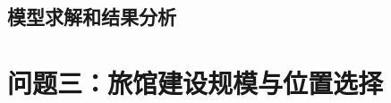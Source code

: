 



\subsection[\hspace{-2pt}模型求解和结果分析]{{\heiti{} \hspace{-8pt}模型求解和结果分析}}\label{section2: 模型求解和结果分析}




\section[\hspace{-2pt}问题三：旅馆建设规模与位置选择]{{\heiti{} \hspace{-8pt}问题三：旅馆建设规模与位置选择}}\label{section4: 问题3：旅馆建设规模与位置选择}

